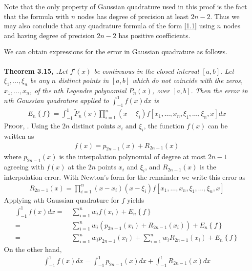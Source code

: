 \documentclass[a4paper]{article}
\numberwithin{equation}{section}
\begin{document}
Note that the only property of Gaussian quadrature used in this proof is the fact that the formula with $n$ nodes has degree of precision at least $2n-2$. Thus we may also conclude that any quadrature formula of the form \eqref{1.1} using $n$ nodes and having degree of precision $2n-2$ has positive coefficients. 

We can obtain expressions for the error in Gaussian quadrature as follows.\\
\\
\textbf{Theorem 3.15, \cite{6}.}\textit{Let $f'\left(x\right)$ be continuous in the closed interval $\left[a,b\right]$. Let $\xi _1,\ldots,\xi _n$ be any $n$ distinct points in $\left[a,b\right]$ which do not coincide with the zeros, $x_1,\ldots,x_n$, of the $n$th Legendre polynomial $P_n\left(x\right)$, over $\left[a,b\right]$. Then the error in $n$th Gaussian quadrature applied to $\int_{ - 1}^1 {f\left( x \right)dx} $ is}
\begin{align}
\label{3.110}
{E_n}\left\{ f \right\} = \int_{ - 1}^1 {{\widetilde P_n}\left( x \right)\prod\limits_{i = 1}^n {\left( {x - {\xi _i}} \right)} f\left[ {{x_1}, \ldots ,{x_n},{\xi _1}, \ldots ,{\xi _n},x} \right]dx} 
\end{align}
\textsc{Proof, \cite{6}.} Using the $2n$ distinct points $x_i$ and $\xi _i$, the function $f\left(x\right)$ can be written as
\begin{align}
f\left( x \right) = {p_{2n - 1}}\left( x \right) + {R_{2n - 1}}\left( x \right)
\end{align}
where $p_{2n-1}\left(x\right)$ is the interpolation polynomial of degree at most $2n-1$ agreeing with $f\left(x\right)$ at the $2n$ points $x_i$ and $\xi _i$, and $R_{2n-1}\left(x\right)$ is the interpolation error. With Newton's form for the remainder we write this error as
\begin{align}
{R_{2n - 1}}\left( x \right) = \prod\limits_{i = 1}^n {\left( {x - {x_i}} \right)\left( {x - {\xi _i}} \right)} f\left[ {{x_1}, \ldots ,{x_n},{\xi _1}, \ldots ,{\xi _n},x} \right]
\end{align}
Applying $n$th Gaussian quadrature for $f$ yields
\begin{align}
\label{3.113}
\int_{ - 1}^1 {f\left( x \right)dx}  =&\ \sum\limits_{i = 1}^n {{w_i}f\left( {{x_i}} \right)}  + {E_n}\left\{ f \right\}\\
=&\ \sum\limits_{i = 1}^n {{w_i}\left( {{p_{2n - 1}}\left( {{x_i}} \right) + {R_{2n - 1}}\left( {{x_i}} \right)} \right)}  + {E_n}\left\{ f \right\}\\
=&\ \sum\limits_{i = 1}^n {{w_i}{p_{2n - 1}}\left( {{x_i}} \right)}  + \sum\limits_{i = 1}^n {{w_i}{R_{2n - 1}}\left( {{x_i}} \right)}  + {E_n}\left\{ f \right\} \label{3.115}
\end{align}
On the other hand,
\begin{align}
\label{3.116}
\int_{ - 1}^1 {f\left( x \right)dx}  = \int_{ - 1}^1 {{p_{2n - 1}}\left( x \right)dx}  + \int_{ - 1}^1 {{R_{2n - 1}}\left( x \right)dx} 
\end{align}
\end{document}
